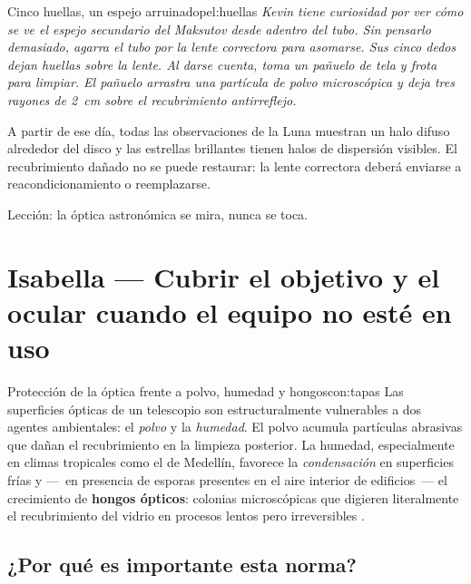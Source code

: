 \documentclass[12pt,oneside]{book}
\begin{document}
\begin{peligro}{Cinco huellas, un espejo arruinado}{pel:huellas}
    \itshape
    Kevin tiene curiosidad por ver cómo se ve el espejo secundario del Maksutov
    desde adentro del tubo. Sin pensarlo demasiado, agarra el tubo por la lente
    correctora para asomarse. Sus cinco dedos dejan huellas sobre la lente.
    Al darse cuenta, toma un pañuelo de tela y frota para limpiar. El pañuelo
    arrastra una partícula de polvo microscópica y deja tres rayones de 2~cm sobre
    el recubrimiento antirreflejo.

    A partir de ese día, todas las observaciones de la Luna muestran un halo difuso
    alrededor del disco y las estrellas brillantes tienen halos de dispersión
    visibles. El recubrimiento dañado no se puede restaurar: la lente correctora
    deberá enviarse a reacondicionamiento o reemplazarse.

    \medskip
    \normalfont
    Lección: la óptica astronómica se mira, nunca se toca.
    \cite{smith2000,thompson2005}
\end{peligro}

\section{Isabella — Cubrir el objetivo y el ocular cuando el equipo no esté en uso}

\begin{concepto}{Protección de la óptica frente a polvo, humedad y hongos}{con:tapas}
    Las superficies ópticas de un telescopio son estructuralmente vulnerables a
    dos agentes ambientales: el \emph{polvo} y la \emph{humedad}. El polvo acumula
    partículas abrasivas que dañan el recubrimiento en la limpieza posterior.
    La humedad, especialmente en climas tropicales como el de Medellín, favorece
    la \emph{condensación} en superficies frías y —~en presencia de esporas
    presentes en el aire interior de edificios~— el crecimiento de \textbf{hongos
    ópticos}: colonias microscópicas que digieren literalmente el recubrimiento
    del vidrio en procesos lentos pero irreversibles \cite{rutten1988,cloudy2019}.
\end{concepto}

\subsection{¿Por qué es importante esta norma?}
\end{document}
